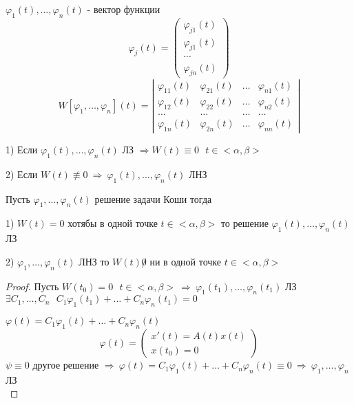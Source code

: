 \begin{define}
  $\varphi_1(t), \ldots, \varphi_n(t)$ - вектор функции
  $$
  \varphi_j(t) =
  \left(
  \begin{array}{c}
    \varphi_{j1}(t) \\
    \varphi_{j1}(t) \\
    \cdots \\
    \varphi_{jn}(t)
  \end{array}
  \right)
  $$
  $$
  W[\varphi_1, \ldots, \varphi_n](t) =
  \left|
  \begin{array}{cccc}
    \varphi_{11}(t) & \varphi_{21}(t) & \ldots & \varphi_{n1}(t) \\
    \varphi_{12}(t) & \varphi_{22}(t) & \ldots & \varphi_{n2}(t) \\
    \ldots & \ldots & \ldots & \ldots \\
    \varphi_{1n}(t) & \varphi_{2n}(t) & \ldots & \varphi_{nn}(t)
  \end{array}
  \right|
  $$
\end{define}

\begin{block}[Утверждения]
  1) Если $\varphi_1(t), \ldots, \varphi_n(t)$ ЛЗ $\Rightarrow W(t) \equiv 0
  ~~~ t \in <\alpha, \beta>$

  2) Если $W(t) \not\equiv 0 ~ \Rightarrow ~ \varphi_1(t), \ldots,
  \varphi_n(t)$ ЛНЗ
\end{block}

\begin{block}
  Пусть $\varphi_1, \ldots, \varphi_n(t)$
  решение задачи Коши тогда

  1) $W(t) = 0$ хотябы в одной точке
  $t \in <\alpha, \beta>$ то решение $\varphi_1(t), \ldots, \varphi_n(t)$ ЛЗ

  2) $\varphi_1, \ldots, \varphi_n(t)$ ЛНЗ то $W(t) \not0$ ни в одной точке
  $t \in <\alpha, \beta>$
\end{block}

\begin{proof}
  Пусть $W(t_0) = 0 ~~~ t \in <\alpha, \beta> ~ \Rightarrow ~ \varphi_1(t_1),
  \ldots, \varphi_n(t_1)$ ЛЗ $\exists C_1, \ldots, C_n ~~~
  C_1 \varphi_1(t_1) + \ldots + C_n \varphi_n (t_1) = 0$

  $\varphi(t) = C_1\varphi_1(t) + \ldots + C_n \varphi_n(t)$
  $$
  \varphi(t) =
  \left(
  \begin{array}{c}
    x'(t) = A(t)x(t) \\
    x(t_0) = 0
  \end{array}
  \right)
  $$
  $\psi \equiv 0$ другое решение $\Rightarrow ~ \varphi(t) = C_1 \varphi_1(t) +
  \ldots + C_n \varphi_n(t) \equiv 0 ~ \Rightarrow ~ \varphi_1, \ldots,
  \varphi_n$ ЛЗ \\
\end{proof}


